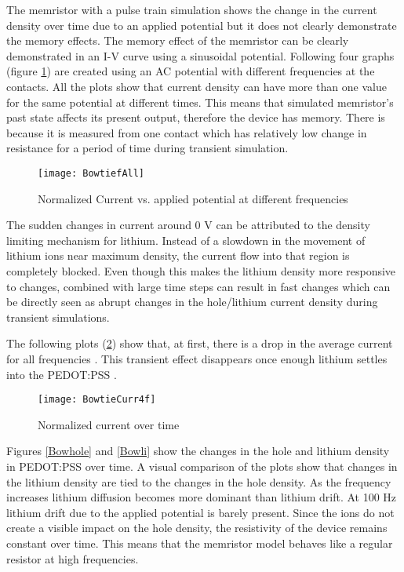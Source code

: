 \begin{doublespace}
The memristor with a pulse train simulation shows the change in the current density over time due to an applied potential but it does not clearly demonstrate the memory effects. The memory effect of the memristor can be clearly demonstrated in an I-V curve using a sinusoidal potential. Following four graphs (figure \ref{Bowtie}) are created using an AC potential with different frequencies at the contacts. All the plots show that current density can have more than one value for the same potential at different times. This means that simulated memristor's past state affects its present output, therefore the device has  memory. There is  because it is measured from one contact which has relatively low change in resistance for a period of time during transient simulation. 

\begin{figure}[!htp]
\centering
\texttt{[image: BowtiefAll]}
\caption{Normalized Current vs. applied potential at different frequencies} 
\label{Bowtie}
\end{figure}

The sudden changes in current around 0 V can be attributed to the density limiting mechanism for lithium. Instead of a slowdown in the movement of lithium ions near maximum density, the current flow into that region is completely blocked. Even though this makes the lithium density more responsive to changes,  combined with large time steps can result in fast changes which can be directly seen as abrupt changes in the hole/lithium current density during transient simulations.  

The following plots (\ref{BowtieCurr}) show that, at first, there is a drop in the average current for all frequencies . This transient effect disappears once enough lithium settles into the PEDOT:PSS . 

\begin{figure}[!htp]
\centering
\texttt{[image: BowtieCurr4f]}
\caption{Normalized current over time} 
\label{BowtieCurr}
\end{figure}

Figures \ref{Bowhole} and \ref{Bowli} show the changes in the hole and lithium density in PEDOT:PSS over time. A visual comparison of the plots show that changes in the lithium density are tied to the changes in the hole density. As the frequency increases lithium diffusion becomes more dominant than lithium drift. At 100 Hz lithium drift due to the applied potential is barely present. Since the ions do not create a visible impact on the hole density, the resistivity of the device remains constant over time. This means that the memristor model behaves like a regular resistor at high frequencies.



\end{doublespace}
